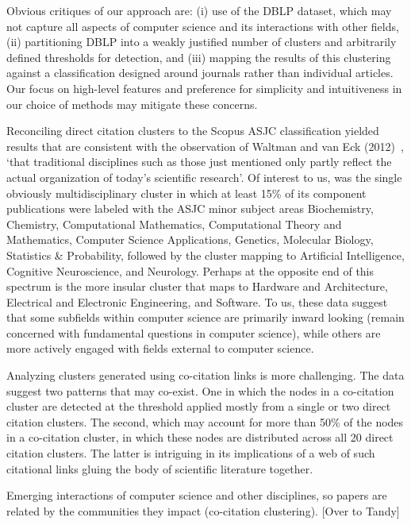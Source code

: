 Obvious critiques of our approach are: (i) use of the DBLP dataset, which may not capture all aspects of computer science and its interactions with other fields, (ii) partitioning DBLP into a weakly justified number of clusters and arbitrarily defined thresholds for detection, and (iii) mapping the results of this clustering against a classification designed around journals rather than individual articles. 
Our focus on high-level features and preference for simplicity and intuitiveness in our choice of methods may mitigate these concerns. 

Reconciling direct citation clusters to the Scopus ASJC classification yielded results that are consistent with the observation of Waltman and van Eck (2012)~\cite{waltman_new_2012}, `that traditional disciplines such as those just mentioned only partly reflect the actual organization of today’s scientific research'. Of interest to us, was the single obviously multidisciplinary cluster in which at least 15\% of its component publications were labeled with the ASJC minor subject areas Biochemistry, Chemistry, Computational Mathematics, Computational Theory and Mathematics, Computer Science Applications, Genetics, Molecular Biology, Statistics \& Probability, followed by the cluster mapping to Artificial Intelligence, Cognitive Neuroscience, and Neurology.  Perhaps at the opposite end of this spectrum is the more insular cluster that maps to Hardware and Architecture, Electrical and Electronic Engineering, and Software. To us, these data suggest that some subfields within computer science are primarily inward looking (remain concerned with fundamental questions in computer science), while others are more actively engaged with fields external to computer science.   

Analyzing clusters generated using co-citation links is more challenging. The data suggest two patterns that may co-exist. One in which the nodes in a co-citation cluster are detected at the threshold applied mostly from a single or two direct citation clusters. The second, which may account for more than 50\% of the nodes in a co-citation cluster, in which these nodes are distributed across all 20 direct citation clusters. The latter is intriguing in its implications of a web of such citational links gluing the body of scientific literature together.

Emerging interactions of computer science and other disciplines, so papers are related by the communities they impact (co-citation clustering). [Over to Tandy]
 
